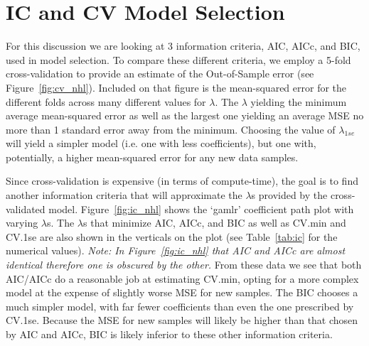 \documentclass[11pt, fleqn]{article}
\begin{document}
\section{IC and CV Model Selection}

For this discussion we are looking at 3 information criteria, AIC, AICc, and BIC, used in model selection.  To compare these different criteria, we employ a 5-fold cross-validation to provide an estimate of the Out-of-Sample error (see Figure~\vref{fig:cv_nhl}).  Included on that figure is the mean-squared error for the different folds across many different values for $\lambda$.  The $\lambda$ yielding the minimum average mean-squared error as well as the largest one yielding an average MSE no more than 1 standard error away from the minimum.  Choosing the value of $\lambda_{1se}$ will yield a simpler model (i.e. one with less coefficients), but one with, potentially, a higher mean-squared error for any new data samples.

Since cross-validation is expensive (in terms of compute-time), the goal is to find another information criteria that will approximate the $\lambda$s provided by the cross-validated model.  Figure~\vref{fig:ic_nhl} shows the `gamlr' coefficient path plot with varying $\lambda$s.  The $\lambda$s that minimize AIC, AICc, and BIC as well as CV.min and CV.1se are also shown in the verticals on the plot (see Table~\vref{tab:ic} for the numerical values).  \textit{Note: In Figure~\vref{fig:ic_nhl} that AIC and AICc are almost identical therefore one is obscured by the other.}  From these data we see that both AIC/AICc do a reasonable job at estimating CV.min, opting for a more complex model at the expense of slightly worse MSE for new samples.  The BIC chooses a much simpler model, with far fewer coefficients than even the one prescribed by CV.1se.  Because the MSE for new samples will likely be higher than that chosen by AIC and AICc, BIC is likely inferior to these other information criteria.
\end{document}
